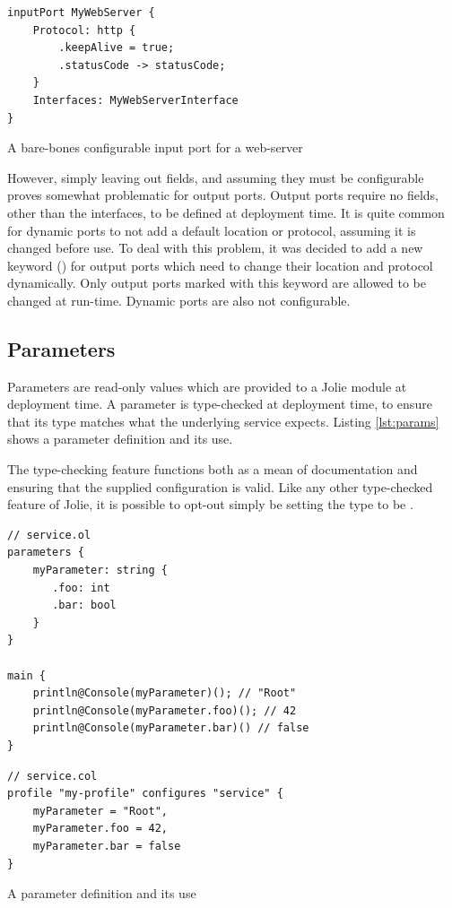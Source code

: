 \begin{listing}[H]
\begin{verbatim}
inputPort MyWebServer {
    Protocol: http {
        .keepAlive = true;
        .statusCode -> statusCode;
    }
    Interfaces: MyWebServerInterface
}
\end{verbatim}
\caption{A bare-bones configurable input port for a web-server}
\label{lst:configurable_input}
\end{listing}

However, simply leaving out fields, and assuming they must be configurable
proves somewhat problematic for output ports. Output ports require no fields,
other than the interfaces, to be defined at deployment time. It is quite
common for dynamic ports to not add a default location or protocol,
assuming it is changed before use. To deal with this problem, it was
decided to add a new keyword () for output ports which
need to change their location and protocol dynamically. Only output
ports marked with this keyword are allowed to be changed at run-time.
Dynamic ports are also not configurable.

\subsection{Parameters}

Parameters are read-only values which are provided to a Jolie module at
deployment time. A parameter is type-checked at deployment time, to ensure that
its type matches what the underlying service expects. Listing \ref{lst:params}
shows a parameter definition and its use.

The type-checking feature functions both as a mean of documentation and
ensuring that the supplied configuration is valid. Like any other type-checked
feature of Jolie, it is possible to opt-out simply be setting the type to be
.

\begin{listing}[H]
\begin{multicols}{2}
\begin{verbatim}
// service.ol
parameters {
    myParameter: string {
       .foo: int
       .bar: bool
    }
}

main {
    println@Console(myParameter)(); // "Root"
    println@Console(myParameter.foo)(); // 42
    println@Console(myParameter.bar)() // false
}
\end{verbatim}

\columnbreak

\begin{verbatim}
// service.col
profile "my-profile" configures "service" {
    myParameter = "Root",
    myParameter.foo = 42,
    myParameter.bar = false
}
\end{verbatim}

\end{multicols}
\caption{A parameter definition and its use}
\label{lst:params}
\end{listing}

